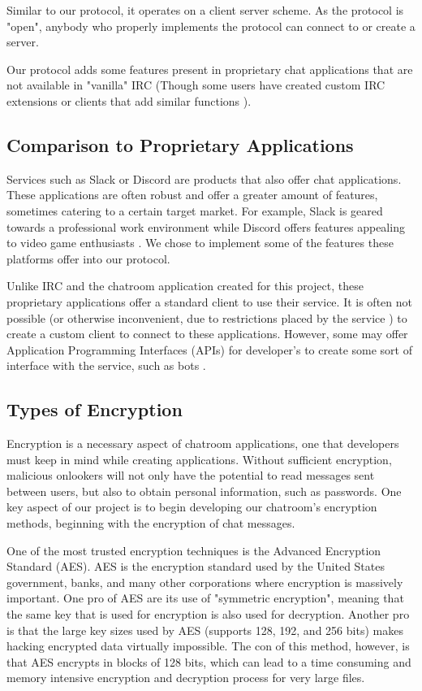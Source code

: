 \documentclass{article}
\begin{document}
Similar to our protocol, it operates on a client server scheme. As the protocol is "open", anybody who properly implements the protocol can connect to or create a server. 

Our protocol adds some features present in proprietary chat applications that are not available in "vanilla" IRC (Though some users have created custom IRC extensions or clients that add similar functions \cite{whatsIRC}).


\subsection{Comparison to Proprietary Applications}

Services such as Slack or Discord are products that also offer chat applications. These applications are often robust and offer a greater amount of features, sometimes catering to a certain target market. For example, Slack is geared towards a professional work environment \cite{slack} while Discord offers features appealing to video game enthusiasts \cite{discord}. We chose to implement some of the features these platforms offer into our protocol.

Unlike IRC and the chatroom application created for this project, these proprietary applications offer a standard client to use their service. It is often not possible (or otherwise inconvenient, due to restrictions placed by the service \cite{discordTweet}) to create a custom client to connect to these applications. However, some may offer Application Programming Interfaces (APIs) for developer's to create some sort of interface with the service, such as bots \cite{discordDev}. 

\subsection{Types of Encryption}

Encryption is a necessary aspect of chatroom applications, one that developers must keep in mind while creating applications. Without sufficient encryption, malicious onlookers will not only have the potential to read messages sent between users, but also to obtain personal information, such as passwords. One key aspect of our project is to begin developing our chatroom's encryption methods, beginning with the encryption of chat messages. 

One of the most trusted encryption techniques is the Advanced Encryption Standard (AES). AES is the encryption standard used by the United States government\cite{US_gov_encryption}, banks, and many other corporations where encryption is massively important. One pro of AES are its use of "symmetric encryption"\cite{Encryption_Types}, meaning that the same key that is used for encryption is also used for decryption. Another pro is that the large key sizes used by AES (supports 128, 192, and 256 bits) makes hacking encrypted data virtually impossible. The con of this method, however, is that AES encrypts in blocks of 128 bits, which can lead to a time consuming and memory intensive encryption and decryption process for very large files. 
\end{document}
